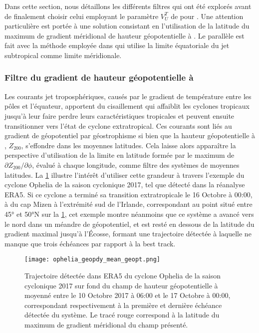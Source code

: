 \documentclass[../main.tex]{subfiles}
\begin{document}
Dans cette section, nous détaillons les différents filtres qui ont été explorés avant de finalement choisir celui employant le paramètre $V_U^T$ de
\citeauthor{hart_cyclone_2003} pour \textcite{dulac_assessing_2023}. Une attention particulière est portée à une solution consistant en l'utilisation de la
latitude du maximum de gradient méridional de hauteur géopotentielle à . Le parallèle est fait avec la méthode employée dans
\textcite{bourdin_intercomparison_2022} qui utilise la limite équatoriale du jet subtropical comme limite méridionale.

\subsubsection*{Filtre du gradient de hauteur géopotentielle à }

Les courants jet troposphériques, causés par le gradient de température entre les pôles et l'équateur, apportent du cisaillement qui affaiblit les cyclones
tropicaux jusqu'à leur faire perdre leurs caractéristiques tropicales et peuvent ensuite transitionner vers l'état de cyclone extratropical. Ces courants sont
liés au gradient de géopotentiel par géostrophisme si bien que la hauteur géopotentielle à , $Z_{200}$, s'effondre dans les moyennes latitudes. Cela
laisse alors apparaître la perspective d'utilisation de la limite en latitude formée par le maximum de $\partial Z_{200} / \partial \phi$, évalué à chaque
longitude, comme filtre des systèmes de moyennes latitudes. La \cref{fig:ophelia_z200} illustre l'intérêt d'utiliser cette grandeur à travers l'exemple du
cyclone Ophelia de la saison cyclonique 2017, tel que détecté dans la réanalyse ERA5. Si ce cyclone a terminé sa transition extratropicale le 16 Octobre à
00:00, à  du cap Mizen à l'extrémité sud de l'Irlande, correspondant au point situé entre \ang{45} et \ang{50}N sur la \cref{fig:ophelia_z200}, cet
exemple montre néanmoins que ce système a avancé vers le nord dans un méandre de géopotentiel, et est resté en dessous de la latitude du gradient maximal
jusqu'à l'Écosse, formant une trajectoire détectée à laquelle ne manque que trois échéances par rapport à la best track.

\begin{figure}[htpb]
    \centering
    \texttt{[image: ophelia\_geopdy\_mean\_geopt.png]}
    \caption{Trajectoire détectée dans ERA5 du cyclone Ophelia de la saison cyclonique 2017 sur fond du champ de hauteur géopotentielle à  moyenné
    entre le 10 Octobre 2017 à 06:00 et le 17 Octobre à 00:00, correspondant respectivement à la première et dernière échéance détectée du système. Le tracé
    rouge correspond à la latitude du maximum de gradient méridional du champ présenté.}
    \label{fig:ophelia_z200}
\end{figure}
\end{document}
